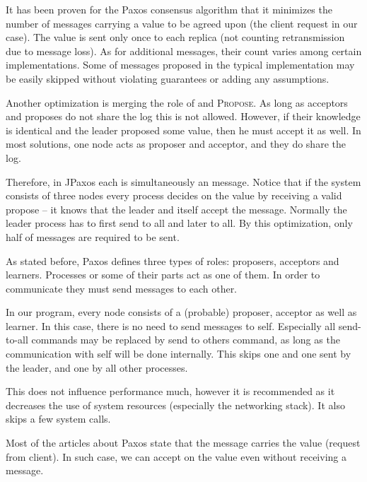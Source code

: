 It has been proven for the Paxos consensus algorithm that it minimizes the number of messages carrying a value to be agreed upon (the client request in our case). The value is sent only once to each replica (not counting retransmission due to message loss). As for additional messages, their count varies among certain implementations. Some of messages proposed in the typical implementation may be easily skipped without violating guarantees or adding any assumptions.


Another optimization is merging the role of \accept and \textsc{Propose}. As long as acceptors and proposes do not share the log this is not allowed. However, if their knowledge is identical and the leader proposed some value, then he must accept it as well. In most solutions, one node acts as proposer and acceptor, and they do share the log.

Therefore, in JPaxos each \propose is simultaneously an \accept message. Notice that if the system consists of three nodes every process decides on the value by receiving a valid propose -- it knows that the leader and itself
accept the message. Normally the leader process has to first send \propose to all and later \accept to all. By this optimization, only half of messages are required to be sent.


As stated before, Paxos defines three types of roles: proposers, acceptors and learners. Processes or some of their parts act as one of them. In order to communicate they must send messages to each other.

In our program, every node consists of a (probable) proposer, acceptor as well as learner. In this case, there is no need to send messages to self. Especially all send-to-all commands may be replaced by send to others command, as long as the communication with self will be done internally. This skips one \accept and one \propose sent by the leader, and one \accept by all other processes.

This does not influence performance much, however it is recommended as it decreases the use of system resources (especially the networking stack). It also skips a few system calls.


Most of the articles about Paxos state that the \accept message carries the value (request from client).
In such case, we can accept on the value even without receiving a \propose message.

